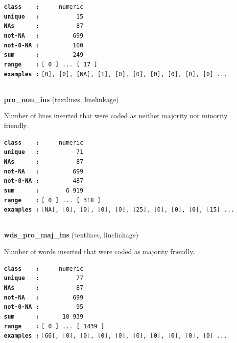 \documentclass[]{article}
\begin{document}
\textbf{\texttt{class\ \ \ \ :}} \texttt{~~~~~numeric}\\
\textbf{\texttt{unique\ \ \ :}} \texttt{~~~~~~~~~~15}\\
\textbf{\texttt{NAs\ \ \ \ \ \ :}} \texttt{~~~~~~~~~~87}\\
\textbf{\texttt{not-NA\ \ \ :}} \texttt{~~~~~~~~~699}\\
\textbf{\texttt{not-0-NA\ :}} \texttt{~~~~~~~~~100}\\
\textbf{\texttt{sum\ \ \ \ \ \ :}} \texttt{~~~~~~~~~249}\\
\textbf{\texttt{range\ \ \ \ :}}
\texttt{{[}\ 0\ {]}\ ...\ {[}\ 17\ {]}}\\
\textbf{\texttt{examples\ :}}
\texttt{{[}0{]},\ {[}0{]},\ {[}NA{]},\ {[}1{]},\ {[}0{]},\ {[}0{]},\ {[}0{]},\ {[}0{]},\ {[}0{]},\ {[}0{]}\ ...}\\

~

\textbf{pro\_non\_ins} (textlines, linelinkage)

Number of lines inserted that were coded as neither majority nor
minority friendly.

\textbf{\texttt{class\ \ \ \ :}} \texttt{~~~~~numeric}\\
\textbf{\texttt{unique\ \ \ :}} \texttt{~~~~~~~~~~71}\\
\textbf{\texttt{NAs\ \ \ \ \ \ :}} \texttt{~~~~~~~~~~87}\\
\textbf{\texttt{not-NA\ \ \ :}} \texttt{~~~~~~~~~699}\\
\textbf{\texttt{not-0-NA\ :}} \texttt{~~~~~~~~~487}\\
\textbf{\texttt{sum\ \ \ \ \ \ :}} \texttt{~~~~~~~6~919}\\
\textbf{\texttt{range\ \ \ \ :}}
\texttt{{[}\ 0\ {]}\ ...\ {[}\ 318\ {]}}\\
\textbf{\texttt{examples\ :}}
\texttt{{[}NA{]},\ {[}0{]},\ {[}0{]},\ {[}0{]},\ {[}0{]},\ {[}25{]},\ {[}0{]},\ {[}0{]},\ {[}0{]},\ {[}15{]}\ ...}\\

~

\textbf{wds\_pro\_maj\_ins} (textlines, linelinkage)

Number of words inserted that were coded as majority friendly.

\textbf{\texttt{class\ \ \ \ :}} \texttt{~~~~~numeric}\\
\textbf{\texttt{unique\ \ \ :}} \texttt{~~~~~~~~~~77}\\
\textbf{\texttt{NAs\ \ \ \ \ \ :}} \texttt{~~~~~~~~~~87}\\
\textbf{\texttt{not-NA\ \ \ :}} \texttt{~~~~~~~~~699}\\
\textbf{\texttt{not-0-NA\ :}} \texttt{~~~~~~~~~~95}\\
\textbf{\texttt{sum\ \ \ \ \ \ :}} \texttt{~~~~~~10~939}\\
\textbf{\texttt{range\ \ \ \ :}}
\texttt{{[}\ 0\ {]}\ ...\ {[}\ 1439\ {]}}\\
\textbf{\texttt{examples\ :}}
\texttt{{[}66{]},\ {[}0{]},\ {[}0{]},\ {[}0{]},\ {[}0{]},\ {[}0{]},\ {[}0{]},\ {[}0{]},\ {[}0{]},\ {[}0{]}\ ...}\\
\end{document}
